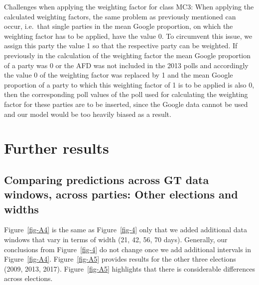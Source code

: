 \documentclass[
  letterpaper,
  DIV=11,
  numbers=noendperiod]{scrartcl}
\begin{document}
Challenges when applying the weighting factor for class MC3: When
applying the calculated weighting factors, the same problem as
previously mentioned can occur, i.e.~that single parties in the mean
Google proportion, on which the weighting factor has to be applied, have
the value 0. To circumvent this issue, we assign this party the value 1
so that the respective party can be weighted. If previously in the
calculation of the weighting factor the mean Google proportion of a
party was 0 or the AFD was not included in the 2013 polls and
accordingly the value 0 of the weighting factor was replaced by 1 and
the mean Google proportion of a party to which this weighting factor of
1 is to be applied is also 0, then the corresponding poll values of the
poll used for calculating the weighting factor for these parties are to
be inserted, since the Google data cannot be used and our model would be
too heavily biased as a result.

\hypertarget{further-results}{%
\section{Further results}\label{further-results}}

\hypertarget{comparing-predictions-across-gt-data-windows-across-parties-other-elections-and-widths}{%
\subsection{Comparing predictions across GT data windows, across
parties: Other elections and
widths}\label{comparing-predictions-across-gt-data-windows-across-parties-other-elections-and-widths}}

Figure~\ref{fig-A4} is the same as Figure~\ref{fig-4} only that we added
additional data windows that vary in terms of width (21, 42, 56, 70
days). Generally, our conclusions from Figure~\ref{fig-4} do not change
once we add additional intervals in Figure~\ref{fig-A4}.
Figure~\ref{fig-A5} provides results for the other three elections
(2009, 2013, 2017). Figure~\ref{fig-A5} highlights that there is
considerable differences across elections.
\end{document}
